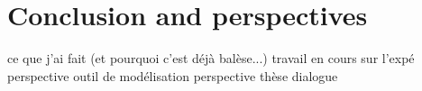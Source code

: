 \chapter{Conclusion and perspectives} %

\label{Chapter 6} %


ce que j'ai fait (et pourquoi c'est déjà balèse...)
travail en cours sur l'expé
perspective outil de modélisation
perspective thèse dialogue